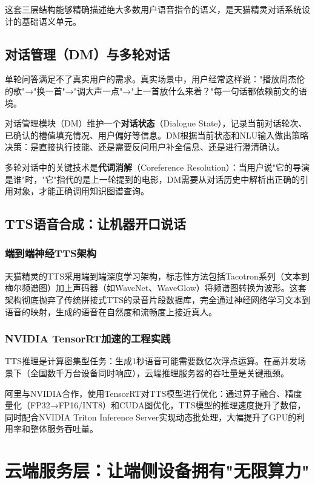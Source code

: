 \documentclass[12pt, a4paper, twoside, openright]{book}
\begin{document}
这套三层结构能够精确描述绝大多数用户语音指令的语义，是天猫精灵对话系统设计的基础语义单元。

\section{对话管理（DM）与多轮对话}

单轮问答满足不了真实用户的需求。真实场景中，用户经常这样说："播放周杰伦的歌"→"换一首"→"调大声一点"→"上一首放什么来着？"每一句话都依赖前文的语境。

对话管理模块（DM）维护一个\textbf{对话状态}（Dialogue State），记录当前对话轮次、已确认的槽值填充情况、用户偏好等信息。DM根据当前状态和NLU输入做出策略决策：是直接执行技能、还是需要反问用户补全信息、还是进行澄清确认。

多轮对话中的关键技术是\textbf{代词消解}（Coreference Resolution）：当用户说"它的导演是谁"时，"它"指代的是上一轮提到的电影，DM需要从对话历史中解析出正确的引用对象，才能正确调用知识图谱查询。

\section{TTS语音合成：让机器开口说话}

\subsection{端到端神经TTS架构}

天猫精灵的TTS采用端到端深度学习架构，标志性方法包括Tacotron系列（文本到梅尔频谱图）加上声码器（如WaveNet、WaveGlow）将频谱图转换为波形。这套架构彻底抛弃了传统拼接式TTS的录音片段数据库，完全通过神经网络学习文本到语音的映射，生成的语音在自然度和流畅度上接近真人。

\subsection{NVIDIA TensorRT加速的工程实践}

TTS推理是计算密集型任务：生成1秒语音可能需要数亿次浮点运算。在高并发场景下（全国数千万台设备同时响应），云端推理服务器的吞吐量是关键瓶颈。

阿里与NVIDIA合作，使用TensorRT对TTS模型进行优化：通过算子融合、精度量化（FP32→FP16/INT8）和CUDA图优化，TTS模型的推理速度提升了数倍，同时配合NVIDIA Triton Inference Server实现动态批处理，大幅提升了GPU的利用率和整体服务吞吐量。

\chapter{云端服务层：让端侧设备拥有"无限算力"}
\label{chap:cloud}
\end{document}
